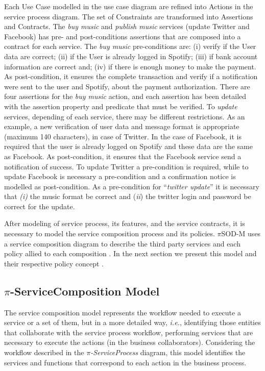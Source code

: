 Each {\sc Use Case} modelled in the use case diagram are refined into {\sc
Actions} in the service process diagram. The set of {\sc Constraints} are
transformed into {\sc Assertions} and {\sc Contracts}. The \textit{buy music}
and \textit{publish music} services (update Twitter and Facebook) has pre- and
post-conditions assertions that are composed into a contract for each service. 
 The  \textit{buy music} pre-conditions are: (i) verify if the User
data are correct; (ii) if the User is already logged in Spotify; (iii) if bank
account information are correct and; (iv) if there is enough money to make the
payment. As post-condition, it ensures the complete transaction and verify if a
notification were sent to the user and Spotify, about the payment authorization.
There are four assertions for the \textit{buy music} action, and each assertion
has been detailed with the assertion property and predicate that must be verified. 
To \textit{update} services, depending of each service, there may be different
restrictions. As an example, a new verification of user data and message format
is appropriate (maximum 140 characters), in case of Twitter. In the case of Facebook, it is required that
the user is already logged on Spotify and these data are the same as
Facebook. As post-condition, it ensures that the Facebook service send a
notification of success. To update Twitter a
pre-condition is required, while to update Facebook is necessary
a pre-condition and a confirmation notice is modelled as post-condition. As a
pre-condition for ``\textit{twitter update}'' it is necessary that \textit{(i)}
the music format be correct and (\textit{ii})  the twitter login and password be
correct for the update.


\bigskip 
\bigskip

After modeling of service process, its features, and the
service contracts, it is necessary to model the service composition process and
its policies. $\pi$SOD-M uses a service composition diagram
to describe the third party services and each policy allied to
each composition . In the next section we present this model and their
respective policy concept .
 
\subsection{$\pi$-ServiceComposition Model}

The service composition model represents the workflow needed to execute a
service or a set of them, but in a more detailed way, \textit{i.e.}, identifying
those entities that collaborate with the service process workflow, performing
services that are necessary to execute the actions (in the business
collaborators). Considering the workflow described in the
\textit{$\pi$-ServiceProcess} diagram, this model identifies the services and
functions that correspond to each action in the business process.

